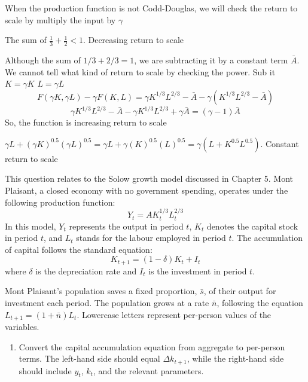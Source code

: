 \documentclass[addpoints,12pt,answers]{exam}
\begin{document}
\begin{questions}
		\begin{solution}
			When the production function is not Codd-Douglas, we will check the return to scale by multiply the input by $\gamma$ 
			\begin{parts}
				\item The sum of $\frac{1}{3} + \frac{1}{2} <1$. Decreasing return to scale
				\item Although the sum of $1/3+2/3 = 1$, we are subtracting it by a constant term $\bar{A}$. We cannot tell what kind of return to scale by checking the power. Sub it $K=\gamma K$ $L=\gamma L$
				\[F(\gamma K, \gamma L) - \gamma F(K,L) = \gamma K^{1/3}L^{2/3} - \bar{A} - \gamma \left(K^{1/3}L^{2/3} - \bar{A}\right)\]
				\[\gamma K^{1/3}L^{2/3} - \bar{A} - \gamma K^{1/3}L^{2/3} + \gamma \bar{A} = (\gamma-1) \bar{A}\]
				So, the function is increasing return to scale
				\item $\gamma L+(\gamma K)^{0.5} (\gamma L)^{0.5} = \gamma L+ \gamma( K)^{0.5} ( L)^{0.5} = \gamma \left(L+K^{0.5}L^{0.5}\right)$. Constant return to scale
			\end{parts}
		\end{solution}
		
		\clearpage
		\question  [25]	This question relates to the Solow growth model discussed in Chapter 5. Mont Plaisant, a closed economy with no government spending, operates under the following production function:
		\[
		Y_t = A K_t^{1/3} L_t^{2/3}
		\]		
		In this model, \(Y_t\) represents the output in period \(t\), \(K_t\) denotes the capital stock in period \(t\), and \(L_t\) stands for the labour employed in period \(t\). The accumulation of capital follows the standard equation:
		\[
		K_{t+1} = (1 - \delta) K_t + I_t
		\]		
		where \(\delta\) is the depreciation rate and \(I_t\) is the investment in period \(t\).
		
		Mont Plaisant's population saves a fixed proportion, \(\bar{s}\), of their output for investment each period. The population grows at a rate \(\bar{n}\), following the equation \(L_{t+1} = (1 + \bar{n}) L_t\). Lowercase letters represent per-person values of the variables.
		
		\begin{enumerate}[label=(\alph*)]
			\item Convert the capital accumulation equation from aggregate to per-person terms. The left-hand side should equal \(\Delta k_{t+1}\), while the right-hand side should include \(y_t\), \(k_t\), and the relevant parameters.
			

\end{enumerate}
\end{questions}
\end{document}
